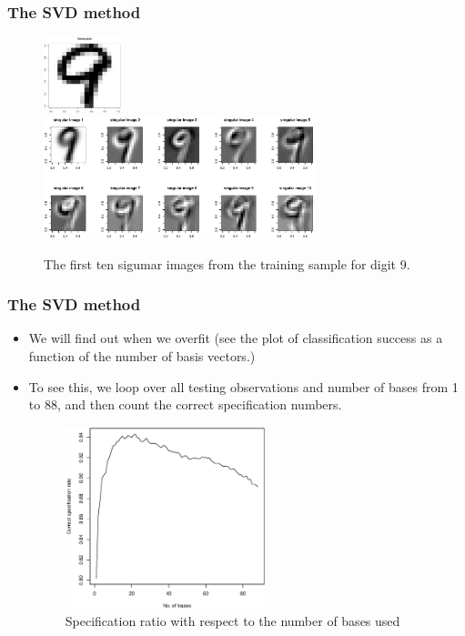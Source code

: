 \documentclass[10pt]{beamer}
\begin{document}
\begin{frame}
\frametitle{The SVD method}

\begin{figure}[h]
  \centering
  \label{fig:test9}
\end{figure}
\begin{figure}
  \centering
  \includegraphics[width=0.2\textwidth]{test9}\\
  \includegraphics[width=0.7\textwidth]{singular-img-9}
  \caption{The first ten sigumar images from the training sample for digit 9.}
  \label{fig:svdimg}
\end{figure}

\end{frame}


\begin{frame}
  \frametitle{The SVD method}

  \begin{itemize}
  \item We will find out when we overfit (see the plot of classification
    success as a function of the number of basis vectors.)

  \item To see this, we loop over all testing observations and number of bases
    from 1 to 88, and then count the correct specification numbers.


\begin{figure}
  \centering
  \includegraphics[width=0.55\textwidth]{CorrectSpect}
  \caption{Specification ratio with respect to the number of bases used}
  \label{fig:bases}
\end{figure}


  \end{itemize}

\end{frame}
\end{document}
